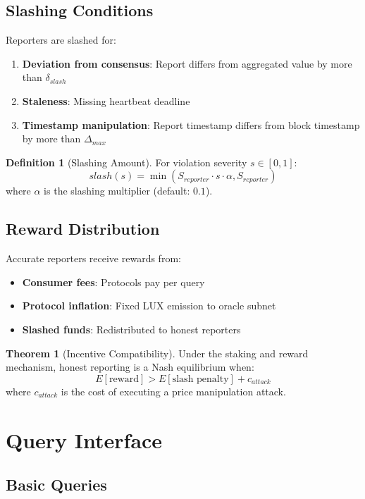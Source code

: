 \documentclass[11pt,a4paper]{article}
\theoremstyle{definition}
\newtheorem{definition}{Definition}
\newtheorem{theorem}{Theorem}
\begin{document}
\subsection{Slashing Conditions}

Reporters are slashed for:

\begin{enumerate}
    \item \textbf{Deviation from consensus}: Report differs from aggregated value by more than $\delta_{slash}$
    \item \textbf{Staleness}: Missing heartbeat deadline
    \item \textbf{Timestamp manipulation}: Report timestamp differs from block timestamp by more than $\Delta_{max}$
\end{enumerate}

\begin{definition}[Slashing Amount]
For violation severity $s \in [0, 1]$:
\[
slash(s) = \min(S_{reporter} \cdot s \cdot \alpha, S_{reporter})
\]
where $\alpha$ is the slashing multiplier (default: $0.1$).
\end{definition}

\subsection{Reward Distribution}

Accurate reporters receive rewards from:
\begin{itemize}
    \item \textbf{Consumer fees}: Protocols pay per query
    \item \textbf{Protocol inflation}: Fixed LUX emission to oracle subnet
    \item \textbf{Slashed funds}: Redistributed to honest reporters
\end{itemize}

\begin{theorem}[Incentive Compatibility]
Under the staking and reward mechanism, honest reporting is a Nash equilibrium when:
\[
E[\text{reward}] > E[\text{slash penalty}] + c_{attack}
\]
where $c_{attack}$ is the cost of executing a price manipulation attack.
\end{theorem}

\section{Query Interface}

\subsection{Basic Queries}
\end{document}

